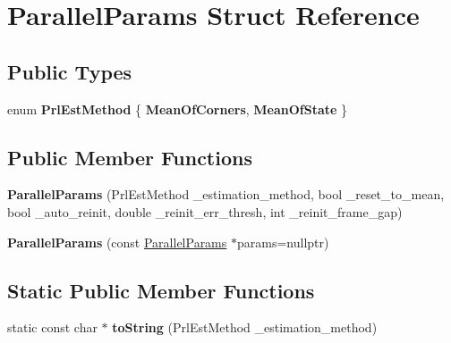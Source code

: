 \hypertarget{structParallelParams}{\section{Parallel\-Params Struct Reference}
\label{structParallelParams}
}
\subsection*{Public Types}
\begin{DoxyCompactItemize}
\item 
enum {\bfseries Prl\-Est\-Method} \{ {\bfseries Mean\-Of\-Corners}, 
{\bfseries Mean\-Of\-State}
 \}
\end{DoxyCompactItemize}
\subsection*{Public Member Functions}
\begin{DoxyCompactItemize}
\item 
\hypertarget{structParallelParams_a2cabff80f8a2f38978fad69d4c598861}{{\bfseries Parallel\-Params} (Prl\-Est\-Method \-\_\-estimation\-\_\-method, bool \-\_\-reset\-\_\-to\-\_\-mean, bool \-\_\-auto\-\_\-reinit, double \-\_\-reinit\-\_\-err\-\_\-thresh, int \-\_\-reinit\-\_\-frame\-\_\-gap)}\label{structParallelParams_a2cabff80f8a2f38978fad69d4c598861}

\item 
\hypertarget{structParallelParams_a1e66691d5ab38cbfde7c9291b701cd80}{{\bfseries Parallel\-Params} (const \hyperlink{structParallelParams}{Parallel\-Params} $\ast$params=nullptr)}\label{structParallelParams_a1e66691d5ab38cbfde7c9291b701cd80}

\end{DoxyCompactItemize}
\subsection*{Static Public Member Functions}
\begin{DoxyCompactItemize}
\item 
\hypertarget{structParallelParams_af0e6e6bf9c46ff8abe0a820a7dbb6c93}{static const char $\ast$ {\bfseries to\-String} (Prl\-Est\-Method \-\_\-estimation\-\_\-method)}\label{structParallelParams_af0e6e6bf9c46ff8abe0a820a7dbb6c93}

\end{DoxyCompactItemize}
